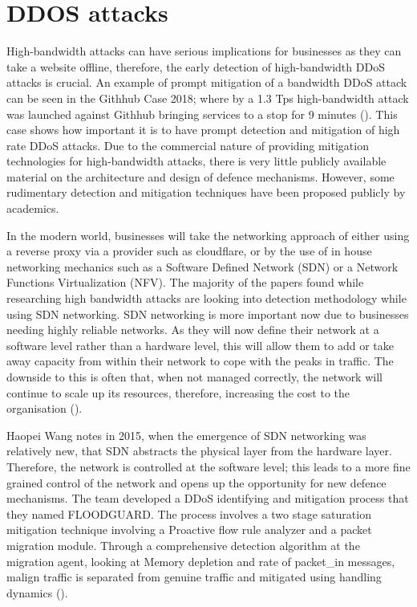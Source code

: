 
\section{DDOS attacks} \label{attack2}

High-bandwidth attacks can have serious implications for businesses as they can take a website offline, therefore, the early detection of high-bandwidth DDoS attacks is crucial. An example of prompt mitigation of a bandwidth DDoS attack can be seen in the Githhub Case 2018; where by a 1.3 Tps high-bandwidth attack was launched against Githhub bringing services to a stop for 9 minutes (\cite{Githhubattacks}). This case shows how important it is to have prompt detection and mitigation of high rate DDoS attacks. Due to the commercial nature of providing mitigation technologies for high-bandwidth attacks, there is very little publicly available material on the architecture and design of defence mechanisms. However, some rudimentary detection and mitigation techniques have been proposed publicly by academics. 

In the modern world, businesses will take the networking approach of either using a reverse proxy via a provider such as cloudflare, or by the use of in house networking mechanics such as a Software Defined Network (SDN) or a Network Functions Virtualization (NFV). The majority of the papers found while researching high bandwidth attacks are looking into detection methodology while using SDN networking. SDN networking is more important now due to businesses needing highly reliable networks.  As they will now define their network at a software level rather than a hardware level, this will allow them to add or take away capacity from within their network to cope with the peaks in traffic. The downside to this is often that, when not managed correctly, the network will continue to scale up its resources, therefore, increasing the cost to the organisation (\cite{Techbeacon}). 

Haopei Wang notes in 2015, when the emergence of SDN networking was relatively new, that SDN abstracts the physical layer from the hardware layer. Therefore, the network is controlled at the software level; this leads to a more fine grained control of the network and opens up the opportunity for new defence mechanisms. The team developed a DDoS identifying and mitigation process that they named FLOODGUARD. The process involves a two stage saturation mitigation technique involving a Proactive flow rule analyzer and a packet migration module. Through a comprehensive detection algorithm at the migration agent, looking at Memory depletion and rate of packet\_in messages, malign traffic is separated from genuine traffic and mitigated using handling dynamics (\cite{7266854}).


